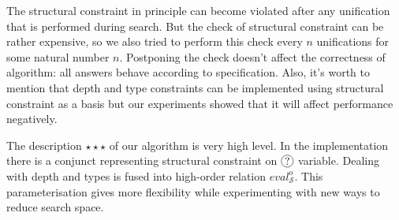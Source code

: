 The structural constraint in principle can become violated after any unification that is performed during search. But the check of structural constraint can be rather expensive, so we also tried to perform this check every $n$ unifications for some natural number $n$. Postponing the check doesn't affect the correctness of algorithm: all answers behave according to specification. Also, it's worth to mention that 
depth and type constraints can be implemented using structural constraint as a basis but our experiments showed that it will affect performance negatively.

The description $\star\star\star$ of our algorithm is very high level. In the implementation there is a conjunct representing structural constraint on $\circled{?}$ variable. Dealing with depth and types is fused into 
high-order relation $eval^o_{\mathcal S}$. This parameterisation gives more flexibility while experimenting with new ways to reduce search space.

